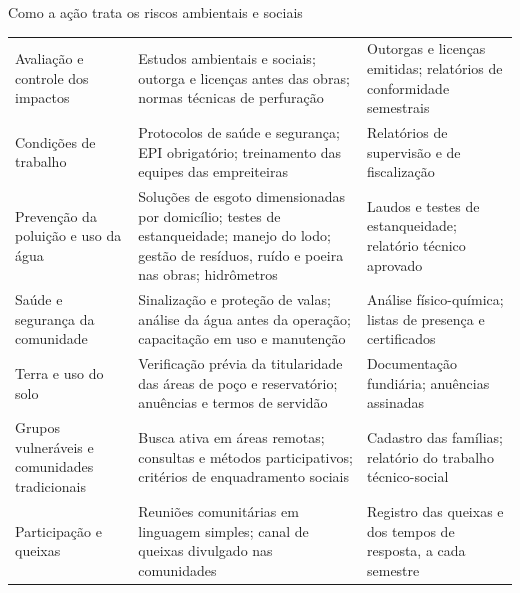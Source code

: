 \begin{quadro}[htbp]
\caption{Como a ação trata os riscos ambientais e sociais}
\label{qua:socioambiental}
\footnotesize
\renewcommand{\arraystretch}{1.25}
\begin{tabularx}{\textwidth}{|P{3.3cm}|L|P{4.2cm}|}
\hline
{} &  &  \\ \hline
Avaliação e controle dos impactos &
  Estudos ambientais e sociais; outorga e licenças antes das obras; normas
  técnicas de perfuração & Outorgas e licenças emitidas; relatórios de
  conformidade semestrais \\ \hline
Condições de trabalho &
  Protocolos de saúde e segurança; EPI obrigatório; treinamento das equipes
  das empreiteiras & Relatórios de supervisão e de fiscalização \\ \hline
Prevenção da poluição e uso da água &
  Soluções de esgoto dimensionadas por domicílio; testes de estanqueidade;
  manejo do lodo; gestão de resíduos, ruído e poeira nas obras; hidrômetros &
  Laudos e testes de estanqueidade; relatório técnico aprovado \\ \hline
Saúde e segurança da comunidade &
  Sinalização e proteção de valas; análise da água antes da operação;
  capacitação em uso e manutenção & Análise físico-química; listas de
  presença e certificados \\ \hline
Terra e uso do solo &
  Verificação prévia da titularidade das áreas de poço e reservatório;
  anuências e termos de servidão & Documentação fundiária; anuências
  assinadas \\ \hline
Grupos vulneráveis e comunidades tradicionais &
  Busca ativa em áreas remotas; consultas e métodos participativos; critérios
  de enquadramento sociais & Cadastro das famílias; relatório do trabalho
  técnico-social \\ \hline
Participação e queixas &
  Reuniões comunitárias em linguagem simples; canal de queixas divulgado nas
  comunidades & Registro das queixas e dos tempos de resposta, a cada
  semestre \\ \hline
\end{tabularx}
\end{quadro}
